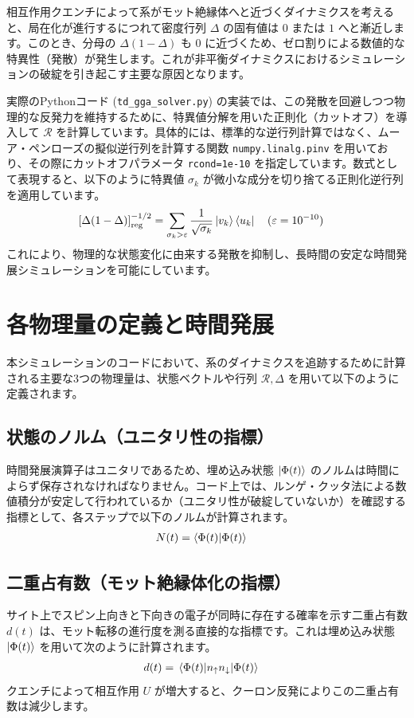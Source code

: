 \documentclass[a4paper,11pt]{ltjarticle}
\begin{document}
相互作用クエンチによって系がモット絶縁体へと近づくダイナミクスを考えると、局在化が進行するにつれて密度行列 $\Delta$ の固有値は $0$ または $1$ へと漸近します。このとき、分母の $\Delta(1-\Delta)$ も $0$ に近づくため、ゼロ割りによる数値的な特異性（発散）が発生します。これが非平衡ダイナミクスにおけるシミュレーションの破綻を引き起こす主要な原因となります。

実際のPythonコード (\texttt{td\_gga\_solver.py}) の実装では、この発散を回避しつつ物理的な反発力を維持するために、特異値分解を用いた正則化（カットオフ）を導入して $\mathcal{R}$ を計算しています。具体的には、標準的な逆行列計算ではなく、ムーア・ペンローズの擬似逆行列を計算する関数 \texttt{numpy.linalg.pinv} を用いており、その際にカットオフパラメータ \texttt{rcond=1e-10} を指定しています。数式として表現すると、以下のように特異値 $\sigma_k$ が微小な成分を切り捨てる正則化逆行列を適用しています。
\begin{align}
    \left[ \Delta(1-\Delta) \right]^{-1/2}_{\text{reg}} &= \sum_{\sigma_k > \varepsilon} \frac{1}{\sqrt{\sigma_k}} \ket{v_k}\bra{u_k} \quad (\varepsilon = 10^{-10})
\end{align}
これにより、物理的な状態変化に由来する発散を抑制し、長時間の安定な時間発展シミュレーションを可能にしています。

\section{各物理量の定義と時間発展}
本シミュレーションのコードにおいて、系のダイナミクスを追跡するために計算される主要な3つの物理量は、状態ベクトルや行列 $\mathcal{R}, \Delta$ を用いて以下のように定義されます。

\subsection{状態のノルム（ユニタリ性の指標）}
時間発展演算子はユニタリであるため、埋め込み状態 $\ket{\Phi(t)}$ のノルムは時間によらず保存されなければなりません。コード上では、ルンゲ・クッタ法による数値積分が安定して行われているか（ユニタリ性が破綻していないか）を確認する指標として、各ステップで以下のノルムが計算されます。
\begin{align}
    N(t) &= \braket{\Phi(t)}{\Phi(t)}
\end{align}

\subsection{二重占有数（モット絶縁体化の指標）}
サイト上でスピン上向きと下向きの電子が同時に存在する確率を示す二重占有数 $d(t)$ は、モット転移の進行度を測る直接的な指標です。これは埋め込み状態 $\ket{\Phi(t)}$ を用いて次のように計算されます。
\begin{align}
    d(t) &= \mel{\Phi(t)}{n_{\uparrow} n_{\downarrow}}{\Phi(t)}
\end{align}
クエンチによって相互作用 $U$ が増大すると、クーロン反発によりこの二重占有数は減少します。
\end{document}
